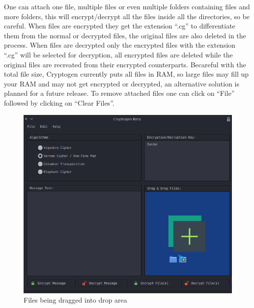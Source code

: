 \documentclass[11pt]{article}
\begin{document}
	 One can attach one file, multiple files or even multiple folders containing files and more folders, this will encrypt/decrypt all the files inside all the directories, so be careful. When files are encrypted they get the extension ``.cg'' to differentiate them from the normal or decrypted files, the original files are also deleted in the process. When files are decrypted only the encrypted files with the extension ``.cg'' will be selected for decryption, all encrypted files are deleted while the original files are recreated from their encrypted counterparts. Becareful with the total file size, Cryptogen currently puts all files in RAM, so large files may fill up your RAM and may not get encrypted or decrypted, an alternative solution is planned for a future release. To remove attached files one can click on ``File'' followed by clicking on ``Clear Files''.

	 \vspace{4cm}
	\begin{figure}[!htb]
	\centering
	\includegraphics[scale=0.55]{dragndrop.png}
	\caption{Files being dragged into drop area} %
	\label{fig:dragndrop} %
	\end{figure}
\end{document}
